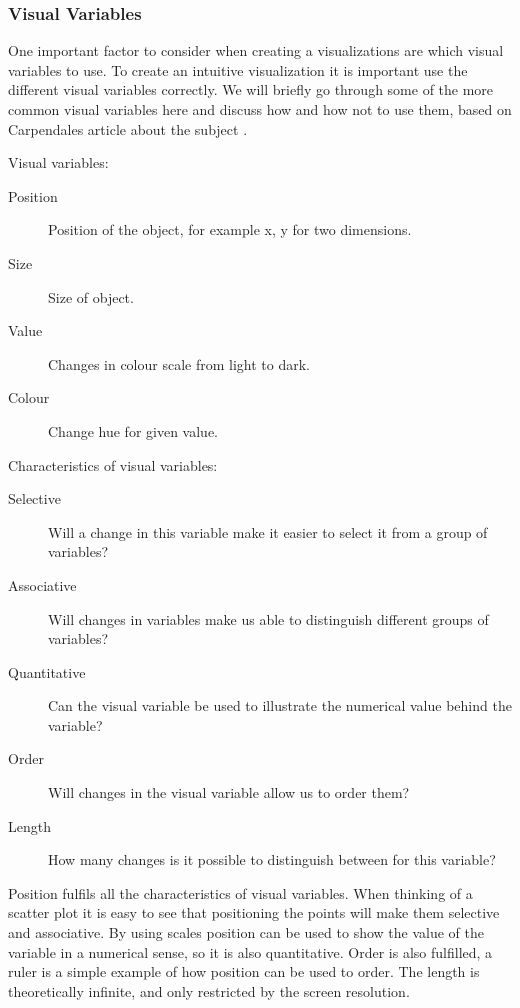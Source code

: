 \subsubsection{Visual Variables}
One important factor to consider when creating a visualizations are which visual variables to use. To create an intuitive visualization it is important use the different visual variables correctly. We will briefly go through some of the more common visual variables here and discuss how and how not to use them, based on Carpendales article about the subject \cite{carpendale}.

Visual variables:
\begin{description}
    \item[Position] Position of the object, for example x, y for two dimensions.
    \item[Size] Size of object.
    \item[Value] Changes in colour scale from light to dark.
    \item[Colour] Change hue for given value.
\end{description}

Characteristics of visual variables:
\begin{description}
    \item[Selective] Will a change in this variable make it easier to select it from a group of variables?
    \item[Associative] Will changes in variables make us able to distinguish different groups of variables?
    \item[Quantitative] Can the visual variable be used to illustrate the numerical value behind the variable?
    \item[Order] Will changes in the visual variable allow us to order them?
    \item[Length] How many changes is it possible to distinguish between for this variable?
\end{description}

Position fulfils all the characteristics of visual variables. When thinking of a scatter plot it is easy to see that positioning the points will make them selective and associative. By using scales position can be used to show the value of the variable in a numerical sense, so it is also quantitative. Order is also fulfilled, a ruler is a simple example of how position can be used to order. The length is theoretically infinite, and only restricted by the screen resolution.

